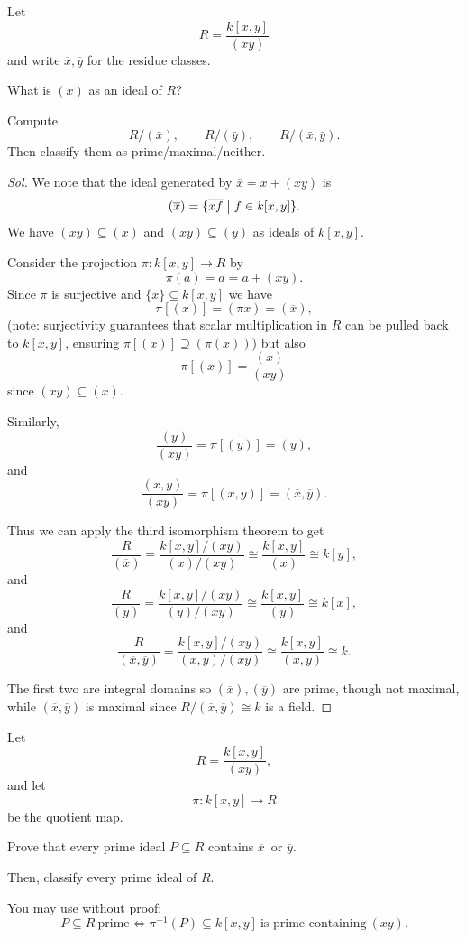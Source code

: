 \documentclass[11pt]{article}
\begin{document}
\begin{prob}
    Let 
    \[
        R = \frac{k[x,y]}{(xy)}
    \]
    and write $\overline x, \overline y$ for the residue classes. 

    What is $(\overline x)$ as an ideal of $R$? 

    Compute 
    \[
        R/(\bar x),\qquad R/(\bar y),\qquad R/(\bar x,\bar y).
    \]
    Then classify them as prime/maximal/neither. 
\end{prob}
\begin{proof}[Sol]
    We note that the ideal 
    generated by $\overline x = x + (xy)$ is 
    \[
        (\overline x) = 
        \{\overline{xf} \bigm| f \in k[x,y]\}. 
    \]
    We have $(xy) \subseteq (x)$ and 
    $(xy) \subseteq (y)$ as ideals of $k[x,y]$. 

    Consider the projection $\pi : k[x,y] \to R$ 
    by 
    \[
        \pi(a) = \overline a = a + (xy). 
    \]
    Since $\pi$ is surjective and $\{x\} \subseteq k[x,y]$ we have 
    \[
        \pi[(x)] = (\pi x) = (\overline x),  
    \]
    (note: surjectivity guarantees that scalar multiplication in 
    $R$ can be pulled back to $k[x,y]$, ensuring 
    $\pi[(x)] \supseteq (\pi(x))$)
    but also 
    \[
        \pi[(x)] = \frac{(x)}{(xy)}
    \]
    since $(xy) \subseteq (x)$. 

    Similarly,
    \[
        \frac{(y)}{(xy)} = \pi[(y)] = (\overline y),
    \]
    and 
    \[
        \frac{(x,y)}{(xy)} = \pi[(x,y)] = (\overline x, \overline y).
    \]

    Thus we can apply the third isomorphism theorem to get 
    \[
        \frac{R}{(\overline x)} = \frac{k[x,y]/(xy)}{(x)/(xy)} 
        \cong \frac{k[x,y]}{(x)} \cong k[y], 
    \]
    and 
    \[
        \frac{R}{(\overline y)} = \frac{k[x,y]/(xy)}{(y)/(xy)} 
        \cong \frac{k[x,y]}{(y)} \cong k[x], 
    \]
    and 
    \[
        \frac{R}{(\overline x, \overline y)} = 
        \frac{k[x,y]/(xy)}{(x, y)/(xy)} 
        \cong \frac{k[x,y]}{(x, y)} \cong k.  
    \]

    The first two are integral domains so 
    $(\overline x), (\overline y)$ are prime, though not 
    maximal, while 
    $(\overline x, \overline y)$ is maximal since 
    $R/(\overline x, \overline y) \cong k$ is a field. 
\end{proof}

\begin{prob}
    Let 
    \[
        R = \frac{k[x,y]}{(xy)}, 
    \]
    and let 
    \[
        \pi : k[x,y] \to R
    \]
    be the quotient map. 

    Prove that every prime ideal $P \subseteq R$ 
    contains $\overline x$ or $\overline y$. 

    Then, classify every prime ideal of $R$. 

    You may use without proof: 
    \[
        P \subseteq R \ \text{prime} 
        \Leftrightarrow \pi^{-1}(P) \subseteq k[x,y] 
        \ \text{is prime containing} \ (xy). 
    \]
\end{prob}
\end{document}
